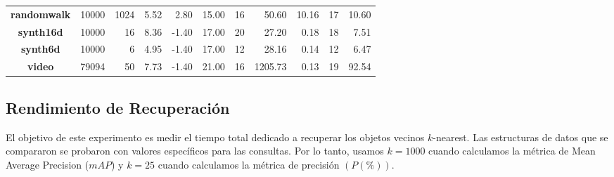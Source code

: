 \begin{table}[!t]
\begin{footnotesize}
\begin{tabular}{c|r|r|r|r|r|r|r|r|r|r|}
\multicolumn{1}{|c|}{\bf randomwalk}            & 10000                 & 1024     & 5.52     & 2.80       & 15.00       & \cellcolor[HTML]{f2f2f2}16                        & \cellcolor[HTML]{f2f2f2}50.60     & 10.16 & \cellcolor[HTML]{DFDFDF}17                    & \cellcolor[HTML]{DFDFDF}10.60                   \\
\multicolumn{1}{|c|}{\bf synth16d}              & 10000                 & 16       & 8.36     & -1.40      & 17.00       & \cellcolor[HTML]{f2f2f2}20                        & \cellcolor[HTML]{f2f2f2}27.20     & 0.18  & \cellcolor[HTML]{DFDFDF}18                    & \cellcolor[HTML]{DFDFDF}7.51                   \\
\multicolumn{1}{|c|}{\bf synth6d}               & 10000                 & 6        & 4.95     & -1.40      & 17.00       & \cellcolor[HTML]{f2f2f2}12                        & \cellcolor[HTML]{f2f2f2}28.16      & 0.14  & \cellcolor[HTML]{DFDFDF}12                    & \cellcolor[HTML]{DFDFDF}6.47                    \\
\multicolumn{1}{|c|}{\bf video}                 & 79094                 & 50       & 7.73     & -1.40      & 21.00       & \cellcolor[HTML]{f2f2f2}16                        & \cellcolor[HTML]{f2f2f2}1205.73     & 0.13  & \cellcolor[HTML]{DFDFDF}19                    & \cellcolor[HTML]{DFDFDF}92.54                   \\ 
\hline
\end{tabular}
\end{footnotesize}
\end{table}

\subsection{Rendimiento de Recuperación} %
El objetivo de este experimento es medir el tiempo total dedicado a recuperar los objetos vecinos $k$-nearest. Las estructuras de datos que se compararon se probaron con valores específicos para las consultas. Por lo tanto, usamos $k = 1000$ cuando calculamos la métrica de Mean Average Precision ($mAP$) y $k = 25$ cuando calculamos la métrica de precisión $ (P(\%)) $.

